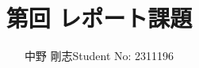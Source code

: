 \documentclass[a4paper,11pt]{jsarticle}
\title{ 第回 レポート課題}
\author{中野 剛志\quad Student No: 2311196}
\date{}
\begin{document}
\maketitle
\section{}

% 
\end{document}

